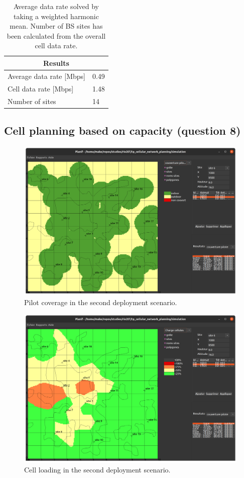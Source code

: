 \documentclass{article}
\begin{document}
\begin{table}[!htb]
    \centering
    \begin{tabular}{l|l|}
    \hline
    \multicolumn{2}{|c|}{\textbf{Results}} \\ \hline
    \multicolumn{1}{|l|}{Average data rate {[}Mbps{]}} & 0.49 \\ \hline
    \multicolumn{1}{|l|}{Cell data rate {[}Mbps{]}}    & 1.48 \\ \hline
    \multicolumn{1}{|l|}{Number of sites}              & 14   \\ \hline
    \end{tabular}
    \label{tab:data_rates}
    \caption{Average data rate solved by taking a weighted harmonic mean. Number of BS sites has been calculated from the overall cell data rate.}
\end{table}

\subsection{Cell planning based on capacity (question 8)}

\begin{figure}[!htb]
    \centering
    \includegraphics[width=12cm]{images/q8_pilot_coverage.png}
    \caption{Pilot coverage in the second deployment scenario.}
    \label{fig:q8_pilot_coverage}
\end{figure}

\begin{figure}[!htb]
    \centering
    \includegraphics[width=12cm]{images/q8_cell_loading.png}
    \caption{Cell loading in the second deployment scenario.}
    \label{fig:q8_cell_loading}
\end{figure}
\end{document}
